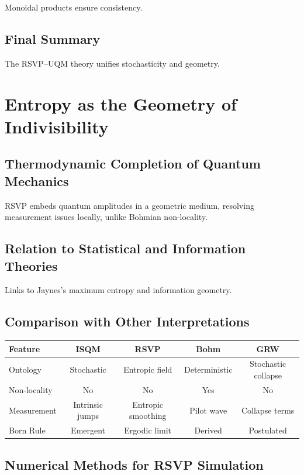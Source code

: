\documentclass[12pt]{article}
\begin{document}
Monoidal products ensure consistency.

\subsection{Final Summary}

The RSVP–UQM theory unifies stochasticity and geometry.

\section{Entropy as the Geometry of Indivisibility}

\subsection{Thermodynamic Completion of Quantum Mechanics}

RSVP embeds quantum amplitudes in a geometric medium, resolving measurement issues locally, unlike Bohmian non-locality.

\subsection{Relation to Statistical and Information Theories}

Links to Jaynes’s maximum entropy \citep{Jaynes1957} and information geometry.

\subsection{Comparison with Other Interpretations}

\begin{center}
\begin{tabular}{@{}lcccc@{}}
\toprule
\textbf{Feature} & \textbf{ISQM} & \textbf{RSVP} & \textbf{Bohm} & \textbf{GRW} \\
\midrule
Ontology & Stochastic & Entropic field & Deterministic & Stochastic collapse \\
Non-locality & No & No & Yes & No \\
Measurement & Intrinsic jumps & Entropic smoothing & Pilot wave & Collapse terms \\
Born Rule & Emergent & Ergodic limit & Derived & Postulated \\
\bottomrule
\end{tabular}
\end{center}

\subsection{Numerical Methods for RSVP Simulation}
\end{document}

